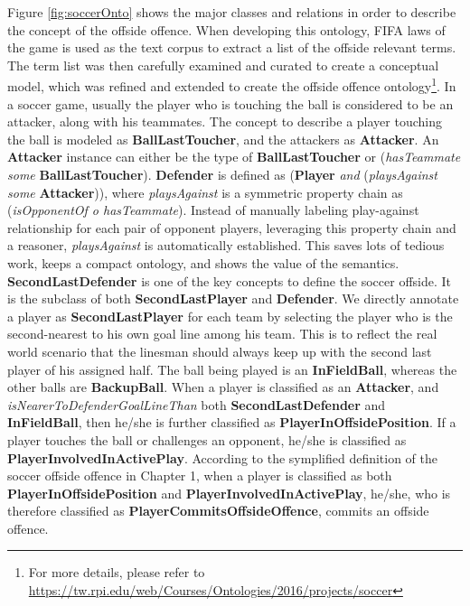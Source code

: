 Figure \ref{fig:soccerOnto} shows the major classes and relations in order to describe the concept of the offside offence.
When developing this ontology, FIFA laws of the game \cite{federation2016laws} is used as the text corpus to extract a list of the offside relevant terms.
The term list was then carefully examined and curated to create a conceptual model, which was refined and extended to create the offside offence ontology\footnote{For more details, please refer to \url{https://tw.rpi.edu/web/Courses/Ontologies/2016/projects/soccer}}.
In a soccer game, usually the player who is touching the ball is considered to be an attacker, along with his teammates.
The concept to describe a player touching the ball is modeled as \textbf{BallLastToucher}, and the attackers as \textbf{Attacker}. 
An \textbf{Attacker} instance can either be the type of \textbf{BallLastToucher} or (\textit{hasTeammate some} \textbf{BallLastToucher}).
\textbf{Defender} is defined as (\textbf{Player} \textit{and} (\textit{playsAgainst some} \textbf{Attacker})),
where \textit{playsAgainst} is a symmetric property chain as (\textit{isOpponentOf o hasTeammate}).
Instead of manually labeling play-against relationship for each pair of opponent players, leveraging this property chain and a reasoner, \textit{playsAgainst} is automatically established.
This saves lots of tedious work, keeps a compact ontology, and shows the value of the semantics.
\textbf{SecondLastDefender} is one of the key concepts to define the soccer offside.
It is the subclass of both \textbf{SecondLastPlayer} and \textbf{Defender}.
We directly annotate a player as \textbf{SecondLastPlayer} for each team by selecting the player who is the second-nearest to his own goal line among his team. 
This is to reflect the real world scenario that the linesman should always keep up with the second last player of his assigned half.
The ball being played is an \textbf{InFieldBall}, whereas the other balls are \textbf{BackupBall}.
When a player is classified as an \textbf{Attacker}, and \textit{isNearerToDefenderGoalLineThan} both \textbf{SecondLastDefender} and \textbf{InFieldBall}, then he/she is further classified as \textbf{PlayerInOffsidePosition}.
If a player touches the ball or challenges an opponent, he/she is classified as \textbf{PlayerInvolvedInActivePlay}.
According to the symplified definition of the soccer offside offence in Chapter 1, when a player is classified as both \textbf{PlayerInOffsidePosition} and \textbf{PlayerInvolvedInActivePlay}, he/she, who is therefore classified as \textbf{PlayerCommitsOffsideOffence}, commits an offside offence.

